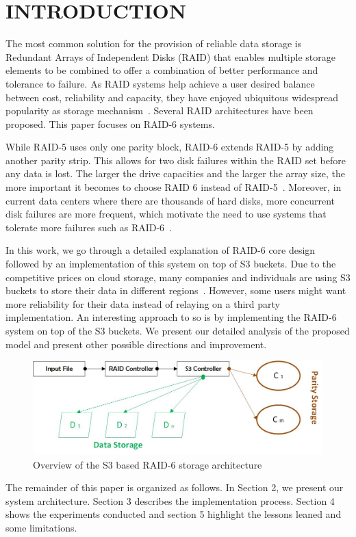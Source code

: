 \section{INTRODUCTION}
\label{sec:intro}

The  most  common  solution  for  the  provision  of  reliable data  storage  is  Redundant Arrays of Independent Disks (RAID) that enables multiple storage elements to be combined to offer a combination of better performance and tolerance to failure.
As RAID systems help achieve a user desired balance between cost, reliability and capacity, they have enjoyed ubiquitous widespread popularity as storage mechanism~\cite{raid_survey}. Several RAID architectures have been proposed. This paper focuses on RAID-6 systems.

While RAID-5 uses only one parity block, RAID-6 extends RAID-5 by adding another parity strip. This allows for two disk failures within the RAID set before any data is lost. The larger the drive capacities and the larger the array size, the more important it becomes to choose RAID 6 instead of RAID-5~\cite{raid6_stop_2019}. Moreover, in current data centers where there are thousands of hard disks, more concurrent disk failures are more frequent, which motivate the need to use systems that tolerate more failures such as RAID-6~\cite{Failure_Trends_2007}.

In this work, we go through a detailed explanation of RAID-6 core design followed by an implementation of this system on top of S3 buckets. Due to the competitive prices on cloud storage, many companies and individuals are using S3 buckets to store their data in different regions~\cite{cloud_2020}. However, some users might want more reliability for their data instead of relaying on a third party implementation. An interesting approach to so is by implementing the RAID-6 system on top of the S3 buckets. We present our detailed analysis of the proposed model and present other possible directions and improvement. 



\begin{figure}
    \centering
    \includegraphics[width=\textwidth]{figures/over_0.jpg}
    \caption {Overview of the S3 based RAID-6 storage architecture}
    \label{fig:overview}
\end{figure}




The remainder of this paper is organized as follows. In
Section 2, we present our system architecture. Section
3 describes the implementation process. Section 4 shows the experiments conducted and section 5 highlight the lessons leaned and some limitations.




